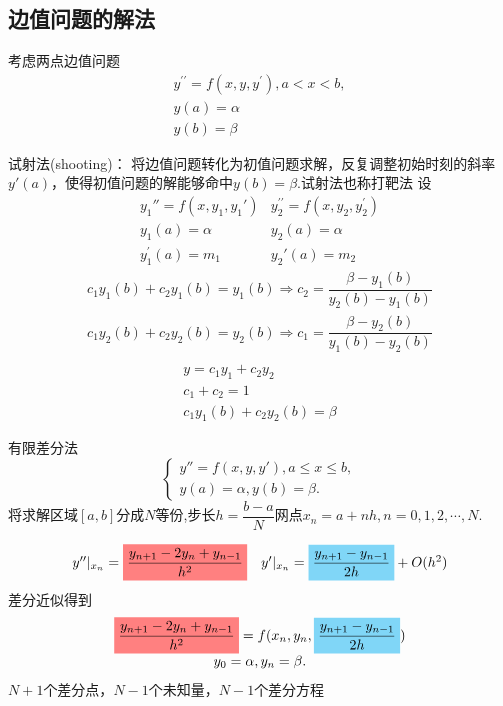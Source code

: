 \subsection{边值问题的解法}
考虑两点边值问题
\[
    \begin{array}{c}
        y^{\prime\prime}=f(x,y,y^{\prime}),a<x<b,\\
        y(a)=\alpha\\
        y(b)=\beta 
    \end{array}
\]
\begin{note}
    试射法(shooting)：
    将边值问题转化为初值问题求解，反复调整初始时刻的斜率$y'(a)$，使得初值问题的解能够命中$y(b) = \beta$.试射法也称打靶法
    设
    \[
        \begin{array}{cc}
            y_{1}''=f(x,y_{1},y_{1}') & y_{2}^{\prime\prime}=f(x,y_{2},y_{2}^{\prime}) \\ 
            y_{1}(a)=\alpha  & y_{2}(a)=\alpha \\
            y_{1}^{\prime}(a)=m_{1} & y_{2}'(a)=m_{2}
        \end{array}
    \]
    \[
        \begin{array}{c}
            c_1y_1(b) + c_2y_{1}(b) = y_{1}(b)\Rightarrow c_2 = \dfrac{\beta-y_1(b)}{y_{2}(b)-y_{1}(b)}\\
            c_1y_2(b) + c_2y_{2}(b) = y_{2}(b)\Rightarrow c_1 = \dfrac{\beta-y_2(b)}{y_{1}(b)-y_{2}(b)}\\
        \end{array}
    \]
    \[
        \begin{array}{c}
            y=c_{1}y_{1}+c_{2}y_{2}\\c_{1}+c_{2}=1\\c_{1}y_{1}(b)+c_{2}y_{2}(b)=\beta 
        \end{array}
    \]
\end{note}
\begin{note}
    有限差分法
    \[
        \begin{cases}y''=f(x,y,y'),a\leq x\leq b,\\y(a)=\alpha,y(b)=\beta.\end{cases}
    \]
    将求解区域$[a,b]$分成$N$等份,步长$h =\dfrac{b-a}{N}$网点$x_n = a+nh,n = 0,1,2,\cdots,N.$

    \[
        \begin{array}{ll}
            y''|_{x_n} = \colorbox{red!50}{$\dfrac{y_{n+1}-2y_{n}+y_{n-1}}{h^{2}}$} & y'|_{x_n} = \colorbox{cyan!50}{$\dfrac{y_{n+1}-y_{n-1}}{2h}$}+O(h^2)
        \end{array}    
    \]
    差分近似得到
    \[
        \begin{array}{c}
            \colorbox{red!50}{$\dfrac{y_{n+1}-2y_{n}+y_{n-1}}{h^{2}}$}=f(x_{n},y_{n},\colorbox{cyan!50}{$\dfrac{y_{n+1}-y_{n-1}}{2h}$})\\
            y_{0}=\alpha,y_{n}=\beta.
        \end{array}
    \]
    $N+1$个差分点，$N-1$个未知量，$N-1$个差分方程
\end{note}
 
